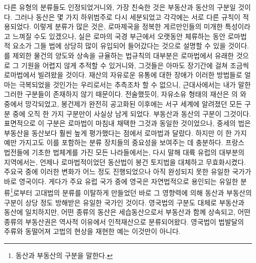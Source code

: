 다른 유형의 분류들도 인정되었거니와,
가장 친숙한 것은 부동산과 동산의 구분일 것이다.
그러나 동산은 몇 가지 하위범주로 다시 세분되었고
각각에는 서로 다른 규칙이 적용되었다.
이렇게 분류가 많은 것은,
로마제국을 정복한 게르만인들의 미개한 특성이라고 느껴질 수도 있겠으나,
실은
로마의 국경 부근에서 오랫동안 체류하는 동안
로마법적 요소가 그들 법에 상당히 많이 유입되어 들어갔다는 것으로
설명할 수 있을 것이다.
를 제외한 물건의 양도와 상속을 규율하는 법규칙의 대부분은
로마법에서 유래한 것으로 그 기원을 어렵지 않게 추적할 수 있거니와,
그것들은 아마도 장기간에 걸쳐
조금씩 로마법에서 빌려왔을 것이다.
재산의 자유로운 유통에 대한 장애가
이러한 방법들로
얼마는 극복되었을 것인가는 우리로서는 추측조차 할 수 없으니,
근대사에서는 내가 말한 그러한 구분들이 존재하지 않기 때문이다.
전술했듯이,
자유소유 형태의 재산은 의 와중에서 망각되었고,
봉건제가 완전히 공고화된 이후에는
서구 세계에 알려졌던 모든 구분 중에 오직 한 가지 구분만이
사실상 남게 되었다.
부동산과 동산의 구분이 그것이다.
표면적으로 이 구분은 로마법이 마침내 채택한 그것과 동일한 것이었으나,
중세의 법은 부동산을 동산보다 훨씬 높게 평가했다는 점에서
로마법과 달랐다.
하지만 이 한 가지 예만 가지고도
이를 포함하는 분류 장치들의 중요성을 보여주는 데 충분하다.
프랑스 법전들에 기초한 법체계를 가진 모든 나라들에서는,
다시 말해 대륙 유럽의 대부분의 지역에서는,
언제나 로마법적이었던 동산법이 봉건 토지법을 대체하고 무효화시켰다.
주요국 중에
이러한 변화가 어느 정도 진행되었으나 아직 완성되지 못한
유일한 국가가 바로 영국이다.
게다가 주요 유럽 국가 중에 영국은
자연법적으로 용인되는 유일한
분류\footnote{%
  동산과 부동산의 구분을 말한다.
}로부터
고대법의 분류를 이탈하게 만들었던
바로 그 영향력에 의해
동산과 부동산의 구분이
상당 정도 방해받은
유일한 국가인 것이다.
영국법의 구분도 대체로 부동산과 동산에 일치하지만,
어떤 종류의 동산은 세습동산으로서 부동산과 함께 상속되고,
어떤 종류의 부동산권은 역사적 이유에서 인적재산으로 분류되어왔다.
영국법이
법발달의 주류와 동떨어져
고법의 현상을 재현한 예는 이것만이 아니다.

